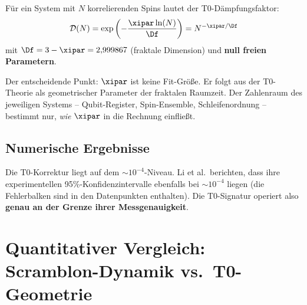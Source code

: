 \begin{definition}
	Für ein System mit $N$ korrelierenden Spins lautet der T0-Dämpfungsfaktor:
	\begin{equation}
		\mathcal{D}(N) = \exp\left(-\frac{\xipar \ln(N)}{\Df}\right) = N^{-\xipar/\Df}
		\label{eq:t0_damping}
	\end{equation}
	mit $\Df = 3 - \xipar = 2{,}999867$ (fraktale Dimension) und \textbf{null freien Parametern}.
\end{definition}

\begin{remark}
	Der entscheidende Punkt: $\xipar$ ist keine Fit-Größe. Er folgt aus der T0-Theorie als geometrischer Parameter der fraktalen Raumzeit. Der Zahlenraum des jeweiligen Systems -- Qubit-Register, Spin-Ensemble, Schleifenordnung -- bestimmt nur, \emph{wie} $\xipar$ in die Rechnung einfließt.
\end{remark}

\subsection{Numerische Ergebnisse}

\begin{table}[h]
	\centering
	\caption{T0-Dämpfungsfaktor für verschiedene effektive Clustergrößen im Adamantan-System}
	\label{tab:t0_damping}
\end{table}

Die T0-Korrektur liegt auf dem $\sim 10^{-4}$-Niveau. Li et al.\ berichten, dass ihre experimentellen 95\%-Konfidenzintervalle ebenfalls bei $\sim 10^{-4}$ liegen (die Fehlerbalken sind in den Datenpunkten enthalten). Die T0-Signatur operiert also \textbf{genau an der Grenze ihrer Messgenauigkeit}.


\section{Quantitativer Vergleich: Scramblon-Dynamik vs.\ T0-Geometrie}
\label{sec:comparison}


